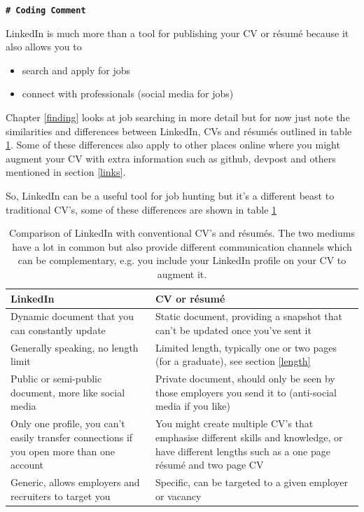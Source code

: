 \documentclass[
]{book}
\providecommand{\tightlist}{%
  \setlength{\itemsep}{0pt}\setlength{\parskip}{0pt}}
\begin{document}
\textbf{\texttt{\#\ Coding\ Comment}}

LinkedIn is much more than a tool for publishing your CV or résumé because it also allows you to

\begin{itemize}
\tightlist
\item
  search and apply for jobs
\item
  connect with professionals (social media for jobs)
\end{itemize}

Chapter \ref{finding} looks at job searching in more detail but for now just note the similarities and differences between LinkedIn, CVs and résumés outlined in table \ref{tab:linkedintable}. Some of these differences also apply to other places online where you might augment your CV with extra information such as github, devpost and others mentioned in section \ref{links}.

So, LinkedIn can be a useful tool for job hunting but it's a different beast to traditional CV's, some of these differences are shown in table \ref{tab:linkedintable}

\begin{table}

\caption{\label{tab:linkedintable}Comparison of LinkedIn with conventional CV's and résumés. The two mediums have a lot in common but also provide different communication channels which can be complementary, e.g. you include your LinkedIn profile on your CV to augment it.}
\centering
\begin{tabular}[t]{ll}
\toprule
LinkedIn & CV or résumé\\
\midrule
Dynamic document that you can constantly update & Static document, providing a snapshot that can't be updated once you've  sent it\\
Generally speaking, no length limit & Limited length, typically one or two pages (for a graduate), see section \ref{length}\\
Public or semi-public document, more like social media & Private document, should only be seen by those employers you send it to (anti-social media if you like)\\
Only one profile, you can't easily transfer connections if you open more than one account & You might create multiple CV's that emphasise different skills and knowledge, or have different lengths such as a one page résumé and two page CV\\
Generic, allows employers and recruiters to target you & Specific, can be targeted to a given employer or vacancy\\
\bottomrule
\end{tabular}
\end{table}
\end{document}
